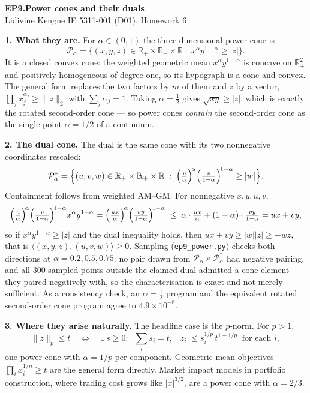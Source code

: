 \documentclass[10pt]{article}
\newcommand{\Rp}{\mathbb{R}_+}
\begin{document}
{\large\bfseries EP9.\quad Power cones and their duals}\\[1pt]
{\small Lidivine Kengne \quad\textbar\quad IE 5311-001 (D01), Homework 6}
\vspace{0.3em}

\textbf{1. What they are.}
For $\alpha \in (0,1)$ the three-dimensional power cone is
\[
  \mathcal{P}_\alpha
  = \bigl\{ (x,y,z) \in \Rp \times \Rp \times \mathbb{R}
      \;:\; x^{\alpha} y^{1-\alpha} \ge |z| \bigr\}.
\]
It is a closed convex cone: the weighted geometric mean
$x^\alpha y^{1-\alpha}$ is concave on $\Rp^2$ and positively
homogeneous of degree one, so its hypograph is a cone and convex. The
general form replaces the two factors by $m$ of them and $z$ by a
vector, $\prod_j x_j^{\alpha_j} \ge \|z\|_2$ with
$\sum_j \alpha_j = 1$. Taking $\alpha = \tfrac12$ gives
$\sqrt{xy} \ge |z|$, which is exactly the rotated second-order cone ---
so power cones \emph{contain} the second-order cone as the single point
$\alpha = 1/2$ of a continuum.

\textbf{2. The dual cone.}
The dual is the same cone with its two nonnegative coordinates
rescaled:
\[
  \mathcal{P}_\alpha^{*}
  = \Bigl\{ (u,v,w) \in \Rp \times \Rp \times \mathbb{R}
      \;:\; \Bigl(\tfrac{u}{\alpha}\Bigr)^{\!\alpha}
            \Bigl(\tfrac{v}{1-\alpha}\Bigr)^{\!1-\alpha} \ge |w| \Bigr\}.
\]
Containment follows from weighted AM--GM. For nonnegative $x,y,u,v$,
\[
  \Bigl(\tfrac{u}{\alpha}\Bigr)^{\!\alpha}
  \Bigl(\tfrac{v}{1-\alpha}\Bigr)^{\!1-\alpha} x^{\alpha} y^{1-\alpha}
  = \Bigl(\tfrac{ux}{\alpha}\Bigr)^{\!\alpha}
    \Bigl(\tfrac{vy}{1-\alpha}\Bigr)^{\!1-\alpha}
  \;\le\; \alpha \cdot \tfrac{ux}{\alpha}
        + (1-\alpha)\cdot \tfrac{vy}{1-\alpha}
  = ux + vy ,
\]
so if $x^\alpha y^{1-\alpha} \ge |z|$ and the dual inequality holds,
then $ux + vy \ge |w||z| \ge -wz$, that is
$\langle (x,y,z),(u,v,w)\rangle \ge 0$. Sampling
(\texttt{ep9\_power.py}) checks both directions at
$\alpha = 0.2, 0.5, 0.75$: no pair drawn from
$\mathcal{P}_\alpha \times \mathcal{P}^*_\alpha$ had negative pairing,
and all $300$ sampled points outside the claimed dual admitted a cone
element they paired negatively with, so the characterisation is exact
and not merely sufficient. As a consistency check, an
$\alpha = \tfrac12$ program and the equivalent rotated second-order
cone program agree to $4.9 \times 10^{-8}$.

\textbf{3. Where they arise naturally.}
The headline case is the $p$-norm. For $p > 1$,
\[
  \|z\|_p \le t
  \quad\Longleftrightarrow\quad
  \exists\, s \ge 0: \;\; \sum_i s_i = t, \;\;
  |z_i| \le s_i^{1/p}\, t^{1-1/p} \;\; \text{for each } i,
\]
one power cone with $\alpha = 1/p$ per component. Geometric-mean
objectives $\prod_i x_i^{1/n} \ge t$ are the general form directly.
Market impact models in portfolio construction, where trading cost
grows like $|x|^{3/2}$, are a power cone with $\alpha = 2/3$.
\end{document}
